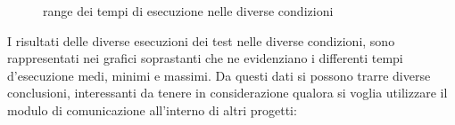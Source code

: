 \documentclass[12pt,a4paper,openright,twoside]{book}
\begin{document}
\begin{figure}[H]
    \caption{range dei tempi di esecuzione nelle diverse condizioni}
    \label{fig:range dei tempi di esecuzione}
\end{figure}

I risultati delle diverse esecuzioni dei test nelle diverse condizioni, sono rappresentati nei grafici soprastanti che ne evidenziano i differenti tempi d'esecuzione 
medi, minimi e massimi. Da questi dati si possono trarre diverse conclusioni, interessanti da tenere in considerazione qualora si voglia utilizzare il modulo di comunicazione 
all'interno di altri progetti:
\end{document}
